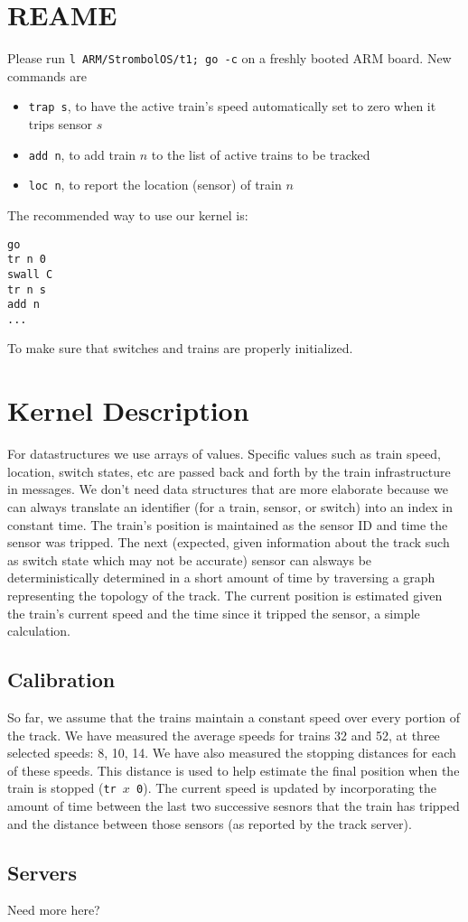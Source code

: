 \documentclass{article}
\begin{document}
\section{REAME}
Please run
\texttt{l ARM/StrombolOS/t1; go -c} on a freshly booted ARM board.
New commands are
\begin{itemize}
\item \texttt{trap s}, to have the active train's speed automatically set to
zero when it trips sensor $s$
\item \texttt{add n}, to add train $n$ to the list of active trains to be
tracked
\item \texttt{loc n}, to report the location (sensor) of train $n$
\end{itemize}
The recommended way to use our kernel is:
\begin{verbatim}
go
tr n 0
swall C
tr n s
add n
...
\end{verbatim}
To make sure that switches and trains are properly initialized.

\section{Kernel Description}

For datastructures we use arrays of values. Specific values such as train
speed, location, switch states, etc are passed back and forth by the train
infrastructure in messages. We don't need data structures that are more
elaborate because we can always translate an identifier (for a train, sensor, or
switch) into an index in constant time. The train's position is maintained as
the sensor ID and time the sensor was tripped. The next (expected, given
information about the track such as switch state which may not be accurate)
sensor can alsways be deterministically determined in a short amount of time
by traversing a graph representing the topology of the track. The current
position is estimated given the train's current speed and the time since it
tripped the sensor, a simple calculation.

\subsection{Calibration}
So far, we assume that the trains maintain a constant speed over every portion
of the track. We have measured the average speeds for trains 32 and 52, at three
selected speeds: 8, 10, 14. We have also measured the stopping distances for
each of these speeds. This distance is used to help estimate the final position
when the train is stopped (\texttt{tr $x$ 0}).
The current speed is updated by incorporating the amount of time between the
last two successive sesnors that the train has tripped and the distance between
those sensors (as reported by the track server).

\subsection{Servers}
Need more here?
\end{document}
